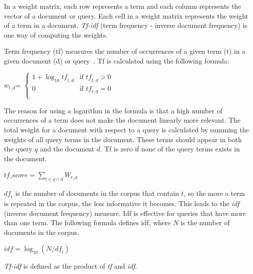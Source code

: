 \documentclass{IOS-Book-Article}
\begin{document}

In a weight matrix, each row represents a term and each column represents the vector of a document or query. 
Each cell in a weight matrix represents the weight of a term in a document. 
\emph{Tf-idf} (term frequency - inverse document frequency) is one way of computing the weights.

Term frequency (tf) measures the number of occurrences of a given term (t) in a given document (d) or query~\citep{SALTON1988}. 
Tf is calculated using the following formula:
\begin{center} 
	$w_{t,d}$=
	$\begin{cases}
	1+\log_{10} \mathit{tf}_{t,d} & \text{if $\mathit{tf}_{t,d}>0$} \\
	0 & \text{if $\mathit{tf}_{t,d}=0$}\\
	\end{cases}$
\end{center}

The reason for using a logarithm in the formula is that a high number of occurrences of a term does not make the document linearly more relevant.
The total weight for a document with respect to a query is calculated by summing the weights of all query terms in the document.
These terms should appear in both the query $q$ and the document $d$.
Tf is zero if none of the query terms exists in the document.

\begin{center}
	$\mathit{tf\_score}=\sum_{t\in q\cap d} W_{t,d}$
\end{center}

$\mathit{df}_t$ is the number of documents in the corpus that contain $t$, so the more a term is repeated in the corpus, the less informative it becomes.
This leads to the \emph{idf} (inverse document frequency) measure.
Idf is effective for queries that have more than one term.
The following formula defines idf, where $N$ is the number of documents in the corpus.

\begin{center} 
	$\mathit{idf}=\log_{10} (N/\mathit{df}_t)$
\end{center}

\emph{Tf-idf} is defined as the product of \emph{tf} and \emph{idf}. 
\end{document}
